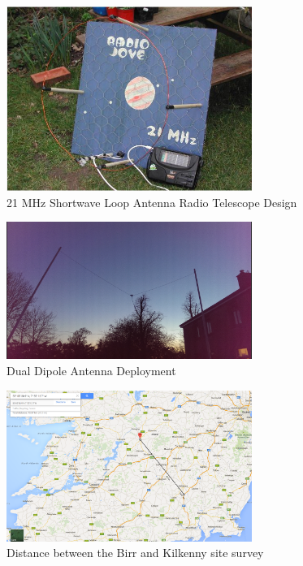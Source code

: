 \documentclass[runningheads,a4paper]{llncs}
\begin{document}
%
\begin{figure}[here]
\centering
\includegraphics[width=8cm]{images/15}
\caption{21 MHz Shortwave Loop Antenna Radio Telescope Design \citep{greef-12}}
\label{fig:loop_antenna_design_c}
\end{figure}
%

%
\begin{figure}[here]
\centering
\includegraphics[width=8cm]{images/32}
\caption{Dual Dipole Antenna Deployment}
\label{fig:dual_dipole_deployed}
\end{figure}
%

%
\begin{figure}[here]
\centering
\includegraphics[width=8cm]{images/36}
\caption{Distance between the Birr and Kilkenny site survey}
\label{fig:site_survey_birr_kilkenny_distance}
\end{figure}
%
\end{document}
